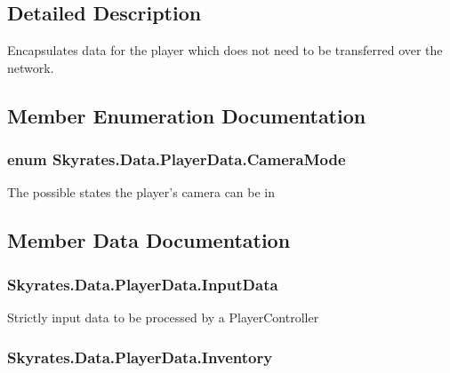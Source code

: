 \subsection{Detailed Description}
Encapsulates data for the player which does not need to be transferred over the network. 



\subsection{Member Enumeration Documentation}
\hypertarget{class_skyrates_1_1_data_1_1_player_data_ac28ce79e15521123667443435b1554ea}{
\subsubsection[{Camera\-Mode}]{\setlength{\rightskip}{0pt plus 5cm}enum {\bf Skyrates.\-Data.\-Player\-Data.\-Camera\-Mode}}}\label{class_skyrates_1_1_data_1_1_player_data_ac28ce79e15521123667443435b1554ea}


The possible states the player's camera can be in 



\subsection{Member Data Documentation}
\hypertarget{class_skyrates_1_1_data_1_1_player_data_aa94e7872cb93055601b695a0345b0ce6}{
\subsubsection[{Input\-Data}]{ Skyrates.\-Data.\-Player\-Data.\-Input\-Data}}\label{class_skyrates_1_1_data_1_1_player_data_aa94e7872cb93055601b695a0345b0ce6}


Strictly input data to be processed by a Player\-Controller 

\hypertarget{class_skyrates_1_1_data_1_1_player_data_ab182e7267c1d6f3f65a49fa2bc62cf4a}{
\subsubsection[{Inventory}]{ Skyrates.\-Data.\-Player\-Data.\-Inventory}}\label{class_skyrates_1_1_data_1_1_player_data_ab182e7267c1d6f3f65a49fa2bc62cf4a}


